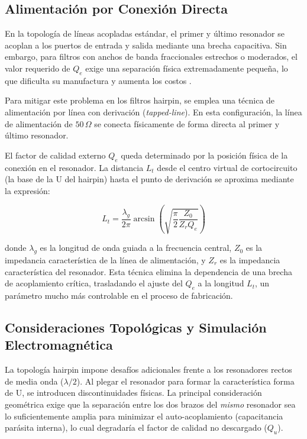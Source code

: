 \subsection{Alimentación por Conexión Directa}
En la topología de líneas acopladas estándar, el primer y último resonador se acoplan a los puertos de entrada y salida mediante una brecha capacitiva. Sin embargo, para filtros con anchos de banda fraccionales estrechos o moderados, el valor requerido de $Q_e$ exige una separación física extremadamente pequeña, lo que dificulta su manufactura y aumenta los costos \cite{HongLancaster}.

Para mitigar este problema en los filtros hairpin, se emplea una técnica de alimentación por línea con derivación (\textit{tapped-line}). En esta configuración, la línea de alimentación de $50\,\Omega$ se conecta físicamente de forma directa al primer y último resonador. 

El factor de calidad externo $Q_e$ queda determinado por la posición física de la conexión en el resonador. La distancia $L_t$ desde el centro virtual de cortocircuito (la base de la U del hairpin) hasta el punto de derivación se aproxima mediante la expresión:

\begin{equation}
L_t = \frac{\lambda_g}{2\pi} \arcsin\left( \sqrt{ \frac{\pi}{2} \frac{Z_0}{Z_r Q_e} } \right)
\end{equation}

donde $\lambda_g$ es la longitud de onda guiada a la frecuencia central, $Z_0$ es la impedancia característica de la línea de alimentación, y $Z_r$ es la impedancia característica del resonador. Esta técnica elimina la dependencia de una brecha de acoplamiento crítica, trasladando el ajuste del $Q_e$ a la longitud $L_t$, un parámetro mucho más controlable en el proceso de fabricación.

\subsection{Consideraciones Topológicas y Simulación Electromagnética}
La topología hairpin impone desafíos adicionales frente a los resonadores rectos de media onda ($\lambda/2$). Al plegar el resonador para formar la característica forma de U, se introducen discontinuidades físicas. La principal consideración geométrica exige que la separación entre los dos brazos del \textit{mismo} resonador sea lo suficientemente amplia para minimizar el auto-acoplamiento (capacitancia parásita interna), lo cual degradaría el factor de calidad no descargado ($Q_u$).

